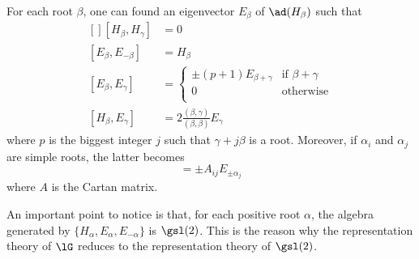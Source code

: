 \begin{theorem}
    For each root $\beta$, one can found an eigenvector $E_{\beta}$ of $\ad(H_{\beta})$ such that
    \begin{equation}            \label{EqChevalleyBasis}
        \begin{aligned}[]
            [H_{\beta},H_{\gamma}]      &=  0\\
            [E_{\beta},E_{-\beta}]      &=  H_{\beta}\\
            [E_{\beta},E_{\gamma}]      &=
                                \begin{cases}
                                    \pm(p+1)E_{\beta+\gamma}    &\text{if }\beta+\gamma\\
                                    0               &\text{otherwise}\\
                                \end{cases}\\
            [H_{\beta},E_{\gamma}]      &=2\frac{ (\beta,\gamma) }{ (\beta,\beta) }E_{\gamma}
        \end{aligned}
    \end{equation}
    where $p$ is the biggest integer $j$ such that $\gamma+j\beta$ is a root. Moreover, if $\alpha_i$ and $\alpha_j$ are simple roots, the latter becomes
    \begin{equation}
        [H_{\alpha_i},E_{\pm\alpha_j}]=\pm A_{ij}E_{\pm\alpha_j}
    \end{equation}
    where $A$ is the Cartan matrix.
\end{theorem}

An important point to notice is that, for each positive root $\alpha$, the algebra generated by $\{ H_{\alpha},E_{\alpha},E_{-\alpha} \}$ is $\gsl(2)$. This is the reason why the representation theory of $\lG$ reduces to the representation theory of $\gsl(2)$.
